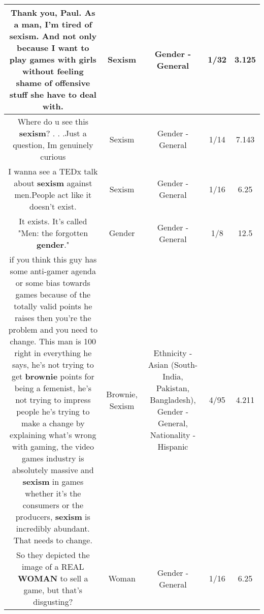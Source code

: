 \documentclass[11pt]{article}
\newlength\mylength
\begin{document}
\begin{center}
\begin{longtable}{|C{.65\mylength}|C{.30\mylength}|C{.12\mylength}|C{.12\mylength}|C{.12\mylength}|}
  \small Thank you, Paul. As a man, I'm tired of \textbf{sexism}. And not only because I want to play games with girls without feeling shame of offensive stuff she have to deal with.\normalsize   & Sexism & Gender - General & 1/32 & 3.125 \\  \hline
  \small Where do u see this \textbf{sexism}? . . .Just a question, Im genuinely curious\normalsize   & Sexism & Gender - General & 1/14 & 7.143 \\  \hline
  \small I wanna see a TEDx talk about \textbf{sexism} against men.People act like it doesn't exist.\normalsize   & Sexism & Gender - General & 1/16 & 6.25 \\  \hline
  \small It exists. It's called "Men: the forgotten \textbf{gender}."\normalsize   & Gender & Gender - General & 1/8 & 12.5 \\  \hline
  \small if you think this guy has some anti-gamer agenda or some bias towards games because of the totally valid points he raises then you're the problem and you need to change. This man is 100 right in everything he says, he's not trying to get \textbf{b\textbf{rownie}} points for being a femenist, he's not trying to impress people he's trying to make a change by explaining what's wrong with gaming, the video games industry is absolutely massive and \textbf{sexism} in games whether it's the consumers or the producers, \textbf{sexism} is incredibly abundant. That needs to change.\normalsize   & Brownie, Sexism & Ethnicity - Asian (South- India, Pakistan, Bangladesh), Gender - General, Nationality - Hispanic & 4/95 & 4.211 \\  \hline
  \small So they depicted the image of a REAL \textbf{WOMAN} to sell a game, but that's disgusting?\normalsize   & Woman & Gender - General & 1/16 & 6.25 \\  \hline

\end{longtable}
\end{center}
\end{document}
